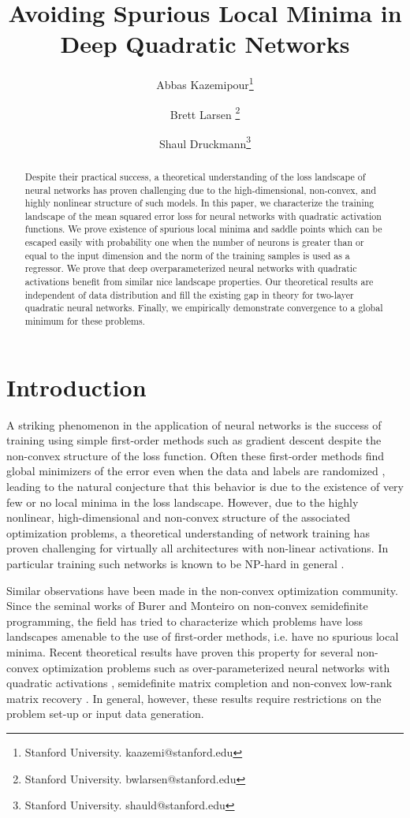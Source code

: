 \documentclass[11pt]{article}
\author{Abbas Kazemipour\thanks{Stanford University. kaazemi@stanford.edu}\and Brett Larsen \thanks{Stanford University. bwlarsen@stanford.edu}\and Shaul Druckmann\thanks{Stanford University. shauld@stanford.edu}}
\theoremstyle{plain}
\theoremstyle{plain}
\numberwithin{equation}{section}
\numberwithin{lemma}{section}
\numberwithin{theorem}{section}
\numberwithin{corollary}{section}
\numberwithin{observation}{section}
\numberwithin{definition}{section}
\numberwithin{example}{section}
\begin{document}
\title{Avoiding Spurious Local Minima in Deep Quadratic Networks}


\maketitle

\begin{abstract}Despite their practical success, a theoretical understanding of the loss landscape of neural networks has proven challenging due to the high-dimensional, non-convex, and highly nonlinear structure of such models. In this paper, we characterize the training landscape of the mean squared error loss for neural networks with quadratic activation functions. We prove existence of spurious local minima and saddle points which can be escaped easily with probability one when the number of neurons is greater than or equal to the input dimension and the norm of the training samples is used as a regressor. We prove that deep overparameterized neural networks with quadratic activations benefit from similar nice landscape properties.  Our theoretical results are independent of data distribution and fill the existing gap in theory for two-layer quadratic neural networks.  Finally, we  empirically demonstrate convergence to a global minimum for these problems.\end{abstract}


\section{Introduction} \label{sec:intro}

A striking phenomenon in the application of neural networks is the success of training using simple first-order methods such as gradient descent despite the non-convex structure of the loss function.  Often these first-order methods find global minimizers of the error even when the data and labels are randomized \cite{zhang2016understanding}, leading to the natural conjecture that this behavior is due to the existence of very few or no local minima in the loss landscape.  However, due to the highly nonlinear, high-dimensional and non-convex structure of the associated optimization problems, a theoretical understanding of network training has proven challenging for virtually all architectures with non-linear activations. In particular training such networks is known to be NP-hard in general \cite{blum1989training}.

Similar observations have been made in the non-convex optimization community. Since the seminal works of Burer and Monteiro \cite{burer2003nonlinear, burer2005local} on non-convex semidefinite programming, the field has tried to characterize which problems have loss landscapes amenable to the use of first-order methods, i.e. have no spurious local minima. Recent theoretical results have proven this property for several non-convex optimization problems such as over-parameterized neural networks with quadratic activations \cite{JS19}, semidefinite matrix completion \cite{ge2016matrix, boumal2016non} and non-convex low-rank matrix recovery \cite{ge2017no,de2014global, bhojanapalli2016global}. In general, however, these results require restrictions on the problem set-up or input data generation. 
\end{document}

